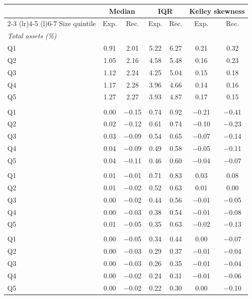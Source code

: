 \begin{tabular}{@{}lcccccc@{}}
\toprule
 & \multicolumn{2}{c}{Median} & \multicolumn{2}{c}{IQR} & \multicolumn{2}{c}{Kelley skewness} \\
\cmidrule(lr){2-3} \cmidrule(lr){4-5} \cmidrule(l){6-7}
Size quintile & Exp. & Rec. & Exp. & Rec. & Exp. & Rec. \\
\midrule
\multicolumn{7}{l}{\textit{Total assets (\%)}} \\
\quad Q1 & 0.91 & 2.01 & 5.22 & 6.27 & 0.21 & 0.32 \\
\quad Q2 & 1.05 & 2.16 & 4.58 & 5.48 & 0.16 & 0.23 \\
\quad Q3 & 1.12 & 2.24 & 4.25 & 5.04 & 0.15 & 0.18 \\
\quad Q4 & 1.17 & 2.28 & 3.96 & 4.66 & 0.14 & 0.16 \\
\quad Q5 & 1.27 & 2.27 & 3.93 & 4.87 & 0.17 & 0.15 \\
\addlinespace
\multicolumn{7}{l}{\textit{Equity to assets (pp)}} \\
\quad Q1 & 0.00 & $-$0.15 & 0.74 & 0.92 & $-$0.21 & $-$0.41 \\
\quad Q2 & 0.02 & $-$0.12 & 0.61 & 0.74 & $-$0.10 & $-$0.23 \\
\quad Q3 & 0.03 & $-$0.09 & 0.54 & 0.65 & $-$0.07 & $-$0.14 \\
\quad Q4 & 0.04 & $-$0.09 & 0.49 & 0.58 & $-$0.05 & $-$0.11 \\
\quad Q5 & 0.04 & $-$0.11 & 0.46 & 0.60 & $-$0.04 & $-$0.07 \\
\addlinespace
\multicolumn{7}{l}{\textit{Return on assets (pp)}} \\
\quad Q1 & 0.01 & $-$0.01 & 0.71 & 0.83 & 0.03 & 0.08 \\
\quad Q2 & 0.01 & $-$0.02 & 0.52 & 0.63 & 0.01 & 0.00 \\
\quad Q3 & 0.00 & $-$0.02 & 0.44 & 0.56 & $-$0.01 & $-$0.05 \\
\quad Q4 & 0.00 & $-$0.03 & 0.38 & 0.54 & $-$0.01 & $-$0.08 \\
\quad Q5 & 0.01 & $-$0.05 & 0.35 & 0.63 & $-$0.02 & $-$0.13 \\
\addlinespace
\multicolumn{7}{l}{\textit{Net interest margin (pp)}} \\
\quad Q1 & 0.00 & $-$0.05 & 0.34 & 0.44 & 0.00 & $-$0.07 \\
\quad Q2 & 0.00 & $-$0.03 & 0.29 & 0.37 & $-$0.01 & $-$0.04 \\
\quad Q3 & 0.00 & $-$0.03 & 0.26 & 0.35 & $-$0.01 & $-$0.04 \\
\quad Q4 & 0.00 & $-$0.02 & 0.24 & 0.31 & $-$0.01 & $-$0.06 \\
\quad Q5 & 0.00 & $-$0.02 & 0.22 & 0.30 & 0.00 & $-$0.10 \\
\bottomrule
\end{tabular}
